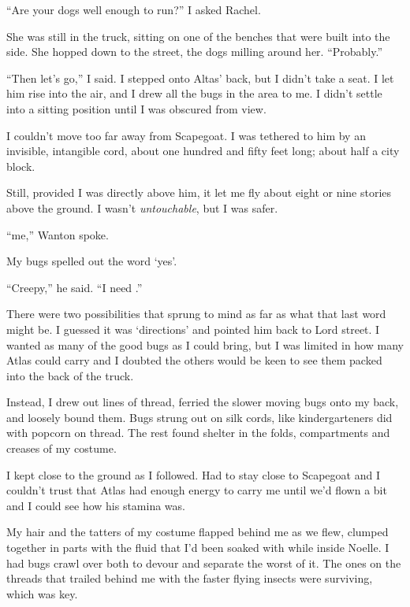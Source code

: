 ``Are your dogs well enough to run?''  I asked Rachel.



She was still in the truck, sitting on one of the benches that were built into the side.  She hopped down to the street, the dogs milling around her.  ``Probably.''



``Then let's go,'' I said.  I stepped onto Altas' back, but I didn't take a seat.  I let him rise into the air, and I drew all the bugs in the area to me.  I didn't settle into a sitting position until I was obscured from view.



I couldn't move too far away from Scapegoat.  I was tethered to him by an invisible, intangible cord, about one hundred and fifty feet long; about half a city block.



Still, provided I was directly above him, it let me fly about eight or nine stories above the ground.  I wasn't \emph{untouchable}, but I was safer.



``\ldotsHear me,'' Wanton spoke.



My bugs spelled out the word `yes'.



``Creepy,'' he said.  ``I need \ldotsrections.''



There were two possibilities that sprung to mind as far as what that last word might be.  I guessed it was `directions' and pointed him back to Lord street.  I wanted as many of the good bugs as I could bring, but I was limited in how many Atlas could carry and I doubted the others would be keen to see them packed into the back of the truck.



Instead, I drew out lines of thread, ferried the slower moving bugs onto my back, and loosely bound them.  Bugs strung out on silk cords, like kindergarteners did with popcorn on thread.  The rest found shelter in the folds, compartments and creases of my costume.



I kept close to the ground as I followed.  Had to stay close to Scapegoat and I couldn't trust that Atlas had enough energy to carry me until we'd flown a bit and I could see how his stamina was.



My hair and the tatters of my costume flapped behind me as we flew, clumped together in parts with the fluid that I'd been soaked with while inside Noelle.  I had bugs crawl over both to devour and separate the worst of it.  The ones on the threads that trailed behind me with the faster flying insects were surviving, which was key.



